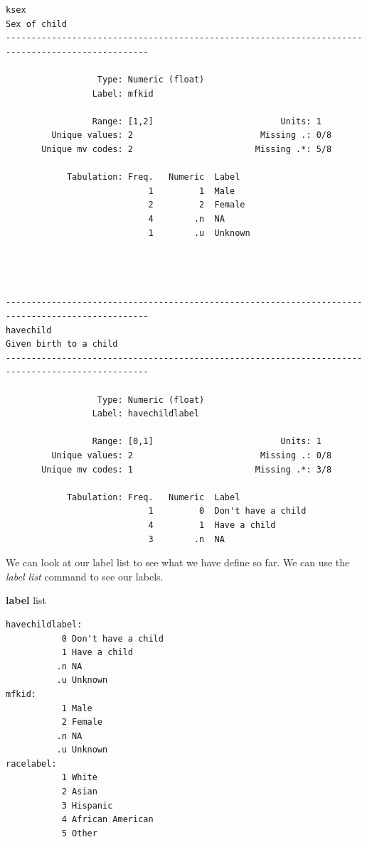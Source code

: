 \documentclass[
]{book}
\newenvironment{Shaded}{\begin{snugshade}}{\end{snugshade}}
\newcommand{\KeywordTok}[1]{\textcolor[rgb]{0.13,0.29,0.53}{\textbf{#1}}}
\newcommand{\OtherTok}[1]{\textcolor[rgb]{0.56,0.35,0.01}{#1}}
\begin{document}
\begin{verbatim}
ksex                                                                                  Sex of child
--------------------------------------------------------------------------------------------------

                  Type: Numeric (float)
                 Label: mfkid

                 Range: [1,2]                         Units: 1
         Unique values: 2                         Missing .: 0/8
       Unique mv codes: 2                        Missing .*: 5/8

            Tabulation: Freq.   Numeric  Label
                            1         1  Male
                            2         2  Female
                            4        .n  NA
                            1        .u  Unknown




--------------------------------------------------------------------------------------------------
havechild                                                                   Given birth to a child
--------------------------------------------------------------------------------------------------

                  Type: Numeric (float)
                 Label: havechildlabel

                 Range: [0,1]                         Units: 1
         Unique values: 2                         Missing .: 0/8
       Unique mv codes: 1                        Missing .*: 3/8

            Tabulation: Freq.   Numeric  Label
                            1         0  Don't have a child
                            4         1  Have a child
                            3        .n  NA
\end{verbatim}

We can look at our label list to see what we have define so far. We can use the \emph{label list} command to see our labels.

\begin{Shaded}
\begin{Highlighting}[]
\KeywordTok{label} \OtherTok{list}
\end{Highlighting}
\end{Shaded}

\begin{verbatim}
havechildlabel:
           0 Don't have a child
           1 Have a child
          .n NA
          .u Unknown
mfkid:
           1 Male
           2 Female
          .n NA
          .u Unknown
racelabel:
           1 White
           2 Asian
           3 Hispanic
           4 African American
           5 Other
\end{verbatim}
\end{document}
